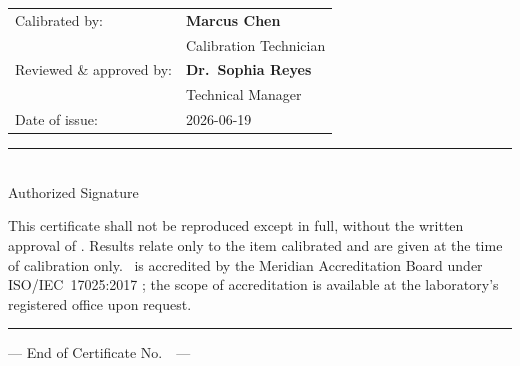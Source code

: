 
\noindent
\begin{minipage}[t]{0.6\linewidth}
  \vspace{0pt}
  \small
  \begin{tabular}{@{}ll@{}}
    Calibrated by: & \textbf{Marcus Chen} \\
                    & Calibration Technician \\[10pt]
    Reviewed \& approved by: & \textbf{Dr.\ Sophia Reyes} \\
                    & Technical Manager \\[10pt]
    Date of issue: & 2026-06-19 \\
  \end{tabular}

  \vspace{10pt}
  \rule{5.5cm}{0.4pt}\\
  {\footnotesize\color{certgray} Authorized Signature}
\end{minipage}\hfill
\begin{minipage}[t]{0.35\linewidth}
  \centering
  \vspace{0pt}
\end{minipage}
\par

\vspace{10pt}
{\footnotesize\color{certgray} This certificate shall not be reproduced except in
full, without the written approval of \CertLabName. Results relate only to the item
calibrated and are given at the time of calibration only. \CertLabName\ is accredited
by the Meridian Accreditation Board under ISO/IEC~17025:2017 \cite{iso17025}; the
scope of accreditation is available at the laboratory's registered office upon
request.}

\vspace{10pt}
{\color{certgold}\rule{\linewidth}{0.4pt}}
\vspace{4pt}

\footnotesize



\vspace{6pt}
\begin{center}
{\footnotesize\color{certgray} --- End of Certificate No.\ \CertNumber\ ---}
\end{center}
